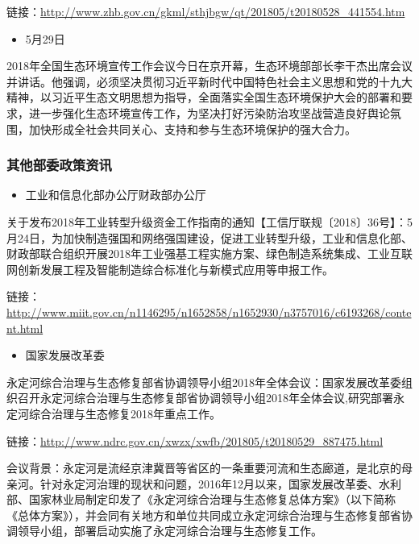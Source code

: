 \documentclass[
]{book}
\providecommand{\tightlist}{%
  \setlength{\itemsep}{0pt}\setlength{\parskip}{0pt}}
\begin{document}
链接：\url{http://www.zhb.gov.cn/gkml/sthjbgw/qt/201805/t20180528_441554.htm}

\begin{itemize}
\tightlist
\item
  5月29日
\end{itemize}

2018年全国生态环境宣传工作会议今日在京开幕，生态环境部部长李干杰出席会议并讲话。他强调，必须坚决贯彻习近平新时代中国特色社会主义思想和党的十九大精神，以习近平生态文明思想为指导，全面落实全国生态环境保护大会的部署和要求，进一步强化生态环境宣传工作，为坚决打好污染防治攻坚战营造良好舆论氛围，加快形成全社会共同关心、支持和参与生态环境保护的强大合力。

\hypertarget{ux5176ux4ed6ux90e8ux59d4ux653fux7b56ux8d44ux8baf-1}{%
\subsubsection*{其他部委政策资讯}\label{ux5176ux4ed6ux90e8ux59d4ux653fux7b56ux8d44ux8baf-1}}

\begin{itemize}
\tightlist
\item
  工业和信息化部办公厅财政部办公厅
\end{itemize}

关于发布2018年工业转型升级资金工作指南的通知【工信厅联规〔2018〕36号】：5月24日，为加快制造强国和网络强国建设，促进工业转型升级，工业和信息化部、财政部联合组织开展2018年工业强基工程实施方案、绿色制造系统集成、工业互联网创新发展工程及智能制造综合标准化与新模式应用等申报工作。

链接：\url{http://www.miit.gov.cn/n1146295/n1652858/n1652930/n3757016/c6193268/content.html}

\begin{itemize}
\tightlist
\item
  国家发展改革委
\end{itemize}

永定河综合治理与生态修复部省协调领导小组2018年全体会议：国家发展改革委组织召开永定河综合治理与生态修复部省协调领导小组2018年全体会议,研究部署永定河综合治理与生态修复2018年重点工作。

链接：\url{http://www.ndrc.gov.cn/xwzx/xwfb/201805/t20180529_887475.html}

会议背景：永定河是流经京津冀晋等省区的一条重要河流和生态廊道，是北京的母亲河。针对永定河治理的现状和问题，2016年12月以来，国家发展改革委、水利部、国家林业局制定印发了《永定河综合治理与生态修复总体方案》（以下简称《总体方案》），并会同有关地方和单位共同成立永定河综合治理与生态修复部省协调领导小组，部署启动实施了永定河综合治理与生态修复工作。
\end{document}
